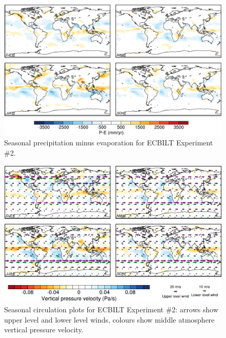 \documentclass[a4paper,11pt]{article}
\begin{document}
\begin{figure}
  \begin{center}
    \includegraphics[width=\textwidth]{../expt-2/plots/pmine-plots}
  \end{center}
  \caption{Seasonal precipitation minus evaporation for ECBILT
    Experiment \#2.}
  \label{fig:pmine-2}
\end{figure}

\begin{figure}
  \begin{center}
    \includegraphics[width=\textwidth]{../expt-2/plots/wind-plots}
  \end{center}
  \caption{Seasonal circulation plots for ECBILT Experiment \#2:
    arrows show upper level and lower level winds, colours show middle
    atmosphere vertical pressure velocity.}
  \label{fig:wind-2}
\end{figure}
\end{document}
